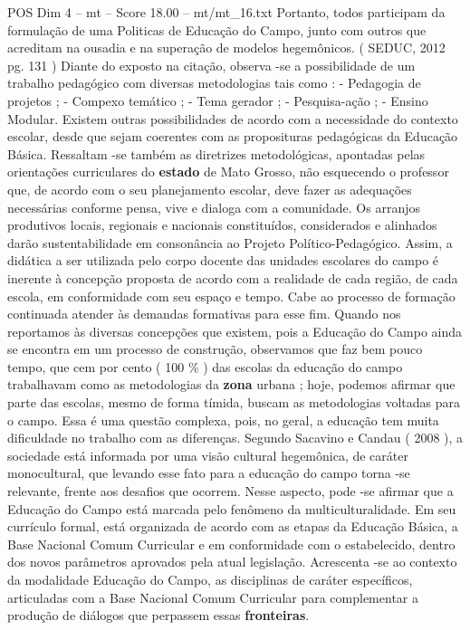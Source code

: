 \begin{textsample}{POS Dim 4 – mt – Score 18.00 – mt/mt\_16.txt}
Portanto, todos participam da formulação de uma Politicas de Educação do Campo, junto com outros que acreditam na ousadia e na superação de modelos hegemônicos. ( SEDUC, 2012 pg. 131 ) Diante do exposto na citação, observa -se a possibilidade de um trabalho pedagógico com diversas metodologias tais como : - Pedagogia de projetos ; - Compexo temático ; - Tema gerador ; - Pesquisa-ação ; - Ensino Modular.
Existem outras possibilidades de acordo com a necessidade do contexto escolar, desde que sejam coerentes com as proposituras pedagógicas da Educação Básica.
Ressaltam -se também as diretrizes metodológicas, apontadas pelas orientações curriculares do \textbf{estado} de Mato Grosso, não esquecendo o professor que, de acordo com o seu planejamento escolar, deve fazer as adequações necessárias conforme pensa, vive e dialoga com a comunidade.
Os arranjos produtivos locais, regionais e nacionais constituídos, considerados e alinhados darão sustentabilidade em consonância ao Projeto Político-Pedagógico.
Assim, a didática a ser utilizada pelo corpo docente das unidades escolares do campo é inerente à concepção proposta de acordo com a realidade de cada região, de cada escola, em conformidade com seu espaço e tempo.
Cabe ao processo de formação continuada atender às demandas formativas para esse fim.
Quando nos reportamos às diversas concepções que existem, pois a Educação do Campo ainda se encontra em um processo de construção, observamos que faz bem pouco tempo, que cem por cento ( 100 \% ) das escolas da educação do campo trabalhavam como as metodologias da \textbf{zona} urbana ; hoje, podemos afirmar que parte das escolas, mesmo de forma tímida, buscam as metodologias voltadas para o campo.
Essa é uma questão complexa, pois, no geral, a educação tem muita dificuldade no trabalho com as diferenças.
Segundo Sacavino e Candau ( 2008 ), a sociedade está informada por uma visão cultural hegemônica, de caráter monocultural, que levando esse fato para a educação do campo torna -se relevante, frente aos desafios que ocorrem.
Nesse aspecto, pode -se afirmar que a Educação do Campo está marcada pelo fenômeno da multiculturalidade.
Em seu currículo formal, está organizada de acordo com as etapas da Educação Básica, a Base Nacional Comum Curricular e em conformidade com o estabelecido, dentro dos novos parâmetros aprovados pela atual legislação.
Acrescenta -se ao contexto da modalidade Educação do Campo, as disciplinas de caráter específicos, articuladas com a Base Nacional Comum Curricular para complementar a produção de diálogos que perpassem essas \textbf{fronteiras}.

\end{textsample}
